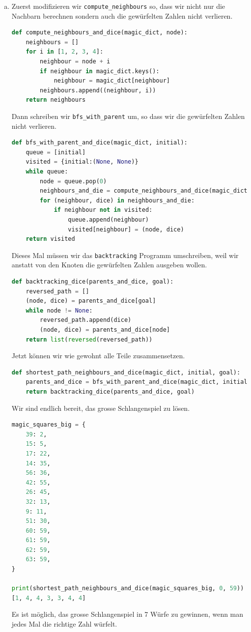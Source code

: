 \begin{enumerate}[(a)]
    \item Zuerst modifizieren wir \texttt{compute\_neighbours} so, dass wir nicht nur die Nachbarn berechnen sondern auch die gewürfelten Zahlen nicht verlieren.
    \begin{lstlisting}[language=Python]
def compute_neighbours_and_dice(magic_dict, node):
    neighbours = []
    for i in [1, 2, 3, 4]:
        neighbour = node + i
        if neighbour in magic_dict.keys():
            neighbour = magic_dict[neighbour]
        neighbours.append((neighbour, i))
    return neighbours
    \end{lstlisting}
    
    Dann schreiben wir \texttt{bfs\_with\_parent} um, so dass wir die gewürfelten Zahlen nicht verlieren.
    \begin{lstlisting}[language=Python]
def bfs_with_parent_and_dice(magic_dict, initial):
    queue = [initial]
    visited = {initial:(None, None)}
    while queue:
        node = queue.pop(0)
        neighbours_and_die = compute_neighbours_and_dice(magic_dict, node)
        for (neighbour, dice) in neighbours_and_die:
            if neighbour not in visited:
                queue.append(neighbour)
                visited[neighbour] = (node, dice)
    return visited
    \end{lstlisting}
    
    Dieses Mal müssen wir das \texttt{backtracking} Programm umschreiben, weil wir anstatt von den Knoten die gewürfelten Zahlen ausgeben wollen.
    \begin{lstlisting}[language=Python]
def backtracking_dice(parents_and_dice, goal):
    reversed_path = []
    (node, dice) = parents_and_dice[goal]
    while node != None:
        reversed_path.append(dice)
        (node, dice) = parents_and_dice[node]
    return list(reversed(reversed_path))
    \end{lstlisting}
    
    Jetzt können wir wie gewohnt alle Teile zusammensetzen.
    \begin{lstlisting}[language=Python]
def shortest_path_neighbours_and_dice(magic_dict, initial, goal):
    parents_and_dice = bfs_with_parent_and_dice(magic_dict, initial)
    return backtracking_dice(parents_and_dice, goal)
    \end{lstlisting}
    
    Wir sind endlich bereit, das grosse Schlangenspiel zu lösen.
    \begin{lstlisting}[language=Python]
magic_squares_big = {
    39: 2,
    15: 5,
    17: 22,
    14: 35,
    56: 36,
    42: 55,
    26: 45,
    32: 13,
    9: 11,
    51: 30,
    60: 59,
    61: 59,
    62: 59,
    63: 59,
}

print(shortest_path_neighbours_and_dice(magic_squares_big, 0, 59))
[1, 4, 4, 3, 3, 4, 4]
    \end{lstlisting}
    Es ist möglich, das grosse Schlangenspiel in 7 Würfe zu gewinnen, wenn man jedes Mal die richtige Zahl würfelt.
\end{enumerate}










